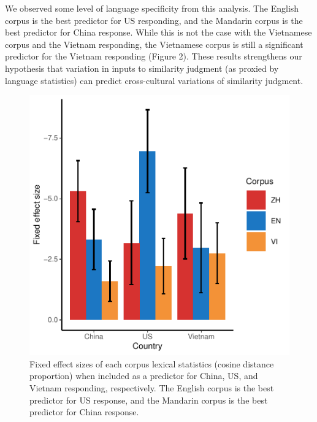 \documentclass[10pt, letterpaper]{article}
\newenvironment{CodeChunk}{}{}
\begin{document}
We observed some level of language specificity from this analysis. The
English corpus is the best predictor for US responding, and the Mandarin
corpus is the best predictor for China response. While this is not the
case with the Vietnamese corpus and the Vietnam responding, the
Vietnamese corpus is still a significant predictor for the Vietnam
responding (Figure 2). These results strengthens our hypothesis that
variation in inputs to similarity judgment (as proxied by language
statistics) can predict cross-cultural variations of similarity
judgment.

\begin{CodeChunk}
\begin{figure}[tb]

{\centering \includegraphics{figs/unnamed-chunk-3-1} 

}

\caption[Fixed effect sizes of each corpus lexical statistics (cosine distance proportion) when included as a predictor for China, US, and Vietnam responding, respectively]{Fixed effect sizes of each corpus lexical statistics (cosine distance proportion) when included as a predictor for China, US, and Vietnam responding, respectively. The English corpus is the best predictor for US response, and the Mandarin corpus is the best predictor for China response.}\label{fig:unnamed-chunk-3}
\end{figure}
\end{CodeChunk}
\end{document}
